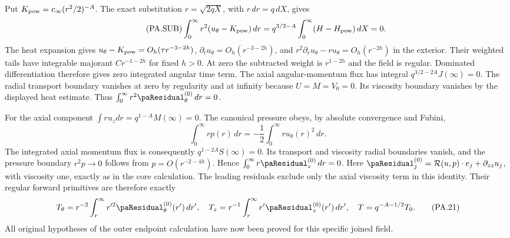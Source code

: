 \documentclass[10pt,a4paper]{article}
\begin{document}
Put $K_{\rm pow}=c_\infty(r^2/2)^{-A}$. The exact substitution
$r=\sqrt{2qX}$, with $r\,dr=q\,dX$, gives
\begin{equation}\label{pa:eq:submoment}\tag{PA.SUB}
 \int_0^\infty r^2(u_\theta-K_{\rm pow})\,dr
  =q^{3/2-A}\int_0^\infty(H-H_{\rm pow})\,dX=0.
\end{equation}
The heat expansion gives $u_\theta-K_{\rm pow}=O_h(\tau r^{-3-2h})$,
$\partial_tu_\theta=O_h(r^{-3-2h})$, and
$r^2\partial_ru_\theta-ru_\theta=O_h(r^{-2h})$ in the exterior.
Their weighted tails have integrable majorant $Cr^{-1-2h}$ for fixed $h>0$.
At zero the subtracted weight is $r^{1-2h}$ and the field is regular.
Dominated differentiation therefore gives zero integrated angular time term.
The axial angular-momentum flux has integral $q^{3/2-2A}J(\infty)=0$.
The radial transport boundary vanishes at zero by regularity and at infinity
because $U=M=V_0=0$. Its viscosity boundary vanishes by the displayed heat
estimate. Thus $\int_0^\infty r^2\paResidual_\theta^{(0)}\,dr=0$.

For the axial component $\int ru_zdr=q^{1-A}M(\infty)=0$. The canonical
pressure obeys, by absolute convergence and Fubini,
\[
 \int_0^\infty rp(r)\,dr
 =-\frac12\int_0^\infty ru_\theta(r)^2\,dr.
\]
The integrated axial momentum flux is consequently
$q^{1-2A}S(\infty)=0$. Its transport and viscosity radial boundaries vanish,
and the pressure boundary $r^2p\to0$ follows from $p=O(r^{-2-4h})$.
Hence $\int_0^\infty r\paResidual_z^{(0)}\,dr=0$. Here
$\paResidual_j^{(0)}=\mathcal R(u,p)\cdot e_j+\partial_{zz}u_j$, with viscosity
one, exactly as in the core calculation. The leading residuals exclude only the
axial viscosity term in this identity. Their regular forward primitives are
therefore exactly
\[
 T_\theta=r^{-2}\int_r^\infty r'^2\paResidual_\theta^{(0)}(r')\,dr',
 \quad T_z=r^{-1}\int_r^\infty r'\paResidual_z^{(0)}(r')\,dr',
 \quad T=q^{-A-1/2}T_0.                                        \tag{PA.21}
\]
All original hypotheses of the outer endpoint calculation have now been
proved for this specific joined field.
\end{document}
